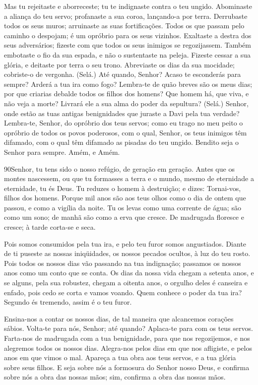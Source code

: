 Mas tu rejeitaste e aborreceste; tu te indignaste contra o teu
ungido. Abominaste a aliança do teu servo; profanaste a sua
coroa, lançando-a por terra. Derrubaste todos os seus muros;
arruinaste as suas fortificações. Todos os que passam pelo
caminho o despojam; é um opróbrio para os seus vizinhos.
Exaltaste a destra dos seus adversários; fizeste com que
todos os seus inimigos se regozijassem. Também embotaste o
fio da sua espada, e não o sustentaste na peleja. Fizeste
cessar a sua glória, e deitaste por terra o seu trono.
Abreviaste os dias da sua mocidade; cobriste-o de vergonha.
(Selá.) Até quando, Senhor? Acaso te esconderás para sempre?
Arderá a tua ira como fogo? Lembra-te de quão breves são os
meus dias; por que criarias debalde todos os filhos dos homens?
Que homem há, que viva, e não veja a morte? Livrará ele a sua
alma do poder da sepultura? (Selá.) Senhor, onde estão as
tuas antigas benignidades que juraste a Davi pela tua verdade?
Lembra-te, Senhor, do opróbrio dos teus servos; como eu trago
no meu peito o opróbrio de todos os povos poderosos, com o
qual, Senhor, os teus inimigos têm difamado, com o qual têm difamado
as pisadas do teu ungido. Bendito seja o Senhor para sempre.
Amém, e Amém.

\bigskip

\lettrine{90}{}Senhor, tu tens sido o nosso refúgio, de geração
em geração. Antes que os montes nascessem, ou que tu formasses a
terra e o mundo, mesmo de eternidade a eternidade, tu és Deus.
Tu reduzes o homem à destruição; e dizes: Tornai-vos, filhos dos
homens. Porque mil anos são aos teus olhos como o dia de ontem
que passou, e como a vigília da noite. Tu os levas como uma
corrente de água; são como um sono; de manhã são como a erva que
cresce. De madrugada floresce e cresce; à tarde corta-se e seca.

Pois somos consumidos pela tua ira, e pelo teu furor somos
angustiados. Diante de ti puseste as nossas iniqüidades, os
nossos pecados ocultos, à luz do teu rosto. Pois todos os nossos
dias vão passando na tua indignação; passamos os nossos anos como um
conto que se conta. Os dias da nossa vida chegam a setenta
anos, e se alguns, pela sua robustez, chegam a oitenta anos, o
orgulho deles é canseira e enfado, pois cedo se corta e vamos
voando. Quem conhece o poder da tua ira? Segundo és tremendo,
assim é o teu furor.

Ensina-nos a contar os nossos dias, de tal maneira que alcancemos
corações sábios. Volta-te para nós, Senhor; até quando?
Aplaca-te para com os teus servos. Farta-nos de madrugada com
a tua benignidade, para que nos regozijemos, e nos alegremos todos
os nossos dias. Alegra-nos pelos dias em que nos afligiste, e
pelos anos em que vimos o mal. Apareça a tua obra aos teus
servos, e a tua glória sobre seus filhos. E seja sobre nós a
formosura do Senhor nosso Deus, e confirma sobre nós a obra das
nossas mãos; sim, confirma a obra das nossas mãos.

